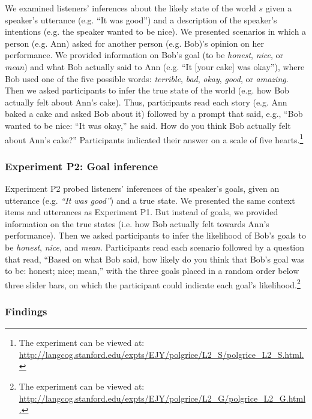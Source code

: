 We examined listeners' inferences about the likely state of the world $s$ given a speaker's utterance (e.g. ``It was good'') and a description of the speaker's intentions (e.g. the speaker wanted to be nice). We presented scenarios in which a person (e.g. Ann) asked for another person (e.g. Bob)'s opinion on her performance. We provided information on Bob's goal (to be \emph{honest}, \emph{nice}, or \emph{mean}) and what Bob actually said to Ann (e.g. ``It [your cake] was okay''), where Bob used one of the five possible words: \emph{terrible}, \emph{bad}, \emph{okay}, \emph{good}, or \emph{amazing}. Then we asked participants to infer the true state of the world (e.g. how Bob actually felt about Ann's cake). Thus, participants read each story (e.g. Ann baked a cake and asked Bob about it) followed by a prompt that said,
e.g., ``Bob wanted to be nice: ``It was okay,'' he said. How do you think Bob actually felt about Ann's cake?''
Participants indicated their answer on a scale of five hearts.\footnote{The experiment can be viewed at: \url{http://langcog.stanford.edu/expts/EJY/polgrice/L2_S/polgrice_L2_S.html.}} 

\subsubsection{Experiment P2: Goal inference}

Experiment P2 probed listeners' inferences of the speaker's goals, given an utterance (e.g. \emph{``It was good''}) and a true state. We presented the same context items and utterances as Experiment P1. But instead of goals, we provided information on the true states (i.e. how Bob actually felt towards Ann's performance).
Then we asked participants to infer the likelihood of Bob's goals to be \emph{honest}, \emph{nice}, and \emph{mean}.
Participants read each scenario followed by a question that read, ``Based on what Bob said, how likely do you think that Bob's goal was to be: honest; nice; mean,'' with the three goals placed in a random order below three slider bars, on which the participant could indicate each goal's likelihood.\footnote{The experiment can be viewed at: \url{http://langcog.stanford.edu/expts/EJY/polgrice/L2_G/polgrice_L2_G.html.}}

\subsubsection{Findings}

